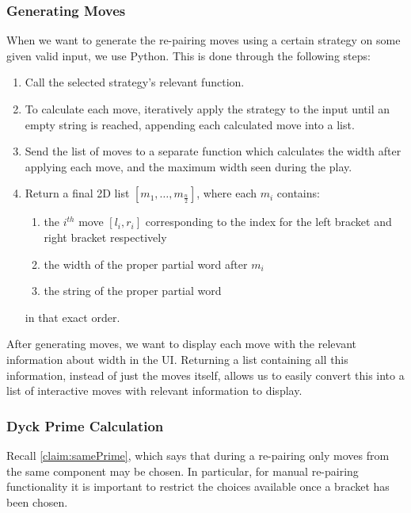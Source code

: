 \subsubsection{Generating Moves}
When we want to generate the re-pairing moves using a certain strategy on some given valid input, we use Python. This is done through the following steps:
\begin{enumerate}
    \item Call the selected strategy's relevant function.
    \item To calculate each move, iteratively apply the strategy to the input until an empty string is reached, appending each calculated move into a list.
    \item Send the list of moves to a separate function which calculates the width after applying each move, and the maximum width seen during the play.
    \item Return a final 2D list $[m_{1}, \dots, m_{\frac{n}{2}}]$, where each $m_{i}$ contains: 
    \begin{enumerate}
        \item the $i^{th}$ move $[l_{i}, r_{i}]$ corresponding to the index for the left bracket and right bracket respectively
        \item the width of the proper partial word after $m_{i}$
        \item the string of the proper partial word
    \end{enumerate}
    in that exact order.
\end{enumerate}
After generating moves, we want to display each move with the relevant information about width in the UI. Returning a list containing all this information, instead of just the moves itself, allows us to easily convert this into a list of interactive moves with relevant information to display.


\subsubsection{Dyck Prime Calculation}
Recall \autoref{claim:samePrime}, which says that during a re-pairing only moves from the same component may be chosen. In particular, for manual re-pairing functionality it is important to restrict the choices available once a bracket has been chosen. 

